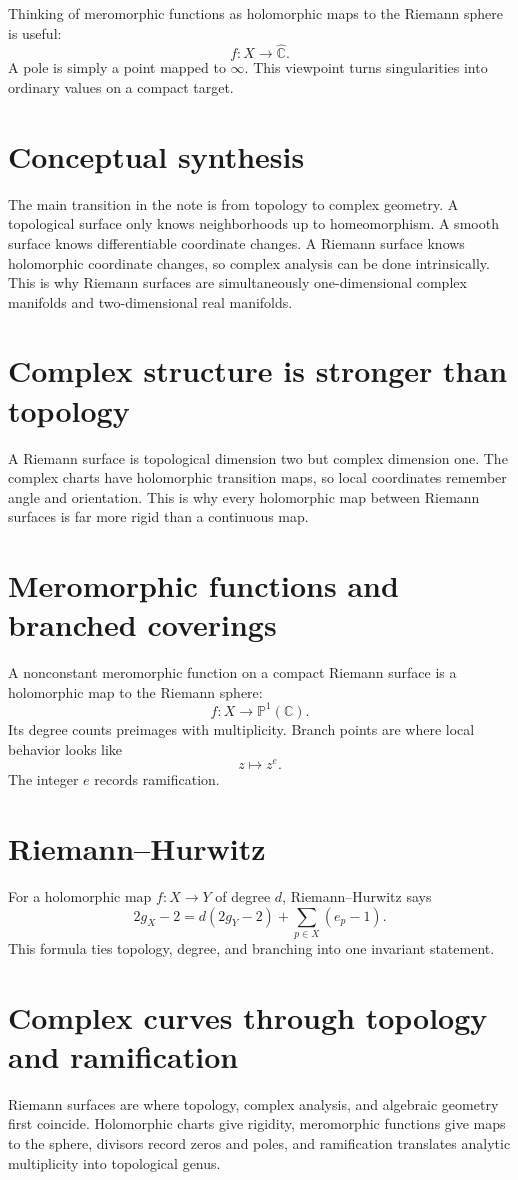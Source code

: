 Thinking of meromorphic functions as holomorphic maps to the Riemann sphere is useful:
\[
  f:X\to\widehat{\mathbb C}.
\]
A pole is simply a point mapped to \(\infty\).  This viewpoint turns singularities into ordinary values on a compact target.

\section{Conceptual synthesis}

The main transition in the note is from topology to complex geometry.  A topological surface only knows neighborhoods up to homeomorphism.  A smooth surface knows differentiable coordinate changes.  A Riemann surface knows holomorphic coordinate changes, so complex analysis can be done intrinsically.  This is why Riemann surfaces are simultaneously one-dimensional complex manifolds and two-dimensional real manifolds.

\section{Complex structure is stronger than topology}

A Riemann surface is topological dimension two but complex dimension one.  The complex charts have holomorphic transition maps, so local coordinates remember angle and orientation.  This is why every holomorphic map between Riemann surfaces is far more rigid than a continuous map.

\section{Meromorphic functions and branched coverings}

A nonconstant meromorphic function on a compact Riemann surface is a holomorphic map to the Riemann sphere:
\[
  f:X\to\mathbb P^1(\mathbb C).
\]
Its degree counts preimages with multiplicity.  Branch points are where local behavior looks like
\[
  z\mapsto z^e.
\]
The integer \(e\) records ramification.

\section{Riemann--Hurwitz}

For a holomorphic map \(f:X\to Y\) of degree \(d\), Riemann--Hurwitz says
\[
  2g_X-2=d(2g_Y-2)+\sum_{p\in X}(e_p-1).
\]
This formula ties topology, degree, and branching into one invariant statement.

\section{Complex curves through topology and ramification}

Riemann surfaces are where topology, complex analysis, and algebraic geometry first coincide.  Holomorphic charts give rigidity, meromorphic functions give maps to the sphere, divisors record zeros and poles, and ramification translates analytic multiplicity into topological genus.
